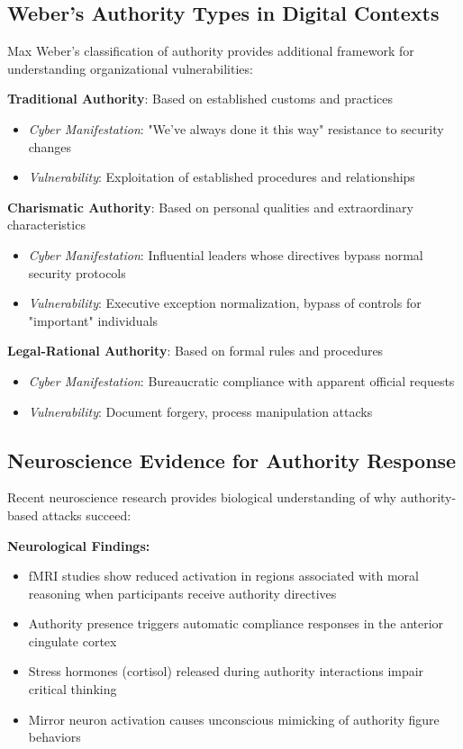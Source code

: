 \documentclass[11pt,a4paper]{article}
\begin{document}
\subsection{Weber's Authority Types in Digital Contexts}

Max Weber's classification of authority provides additional framework for understanding organizational vulnerabilities:

\textbf{Traditional Authority}: Based on established customs and practices
\begin{itemize}
\item \textit{Cyber Manifestation}: "We've always done it this way" resistance to security changes
\item \textit{Vulnerability}: Exploitation of established procedures and relationships
\end{itemize}

\textbf{Charismatic Authority}: Based on personal qualities and extraordinary characteristics
\begin{itemize}
\item \textit{Cyber Manifestation}: Influential leaders whose directives bypass normal security protocols
\item \textit{Vulnerability}: Executive exception normalization, bypass of controls for "important" individuals
\end{itemize}

\textbf{Legal-Rational Authority}: Based on formal rules and procedures
\begin{itemize}
\item \textit{Cyber Manifestation}: Bureaucratic compliance with apparent official requests
\item \textit{Vulnerability}: Document forgery, process manipulation attacks
\end{itemize}

\subsection{Neuroscience Evidence for Authority Response}

Recent neuroscience research provides biological understanding of why authority-based attacks succeed:

\textbf{Neurological Findings:}
\begin{itemize}
\item fMRI studies show reduced activation in regions associated with moral reasoning when participants receive authority directives \cite{blass2012}
\item Authority presence triggers automatic compliance responses in the anterior cingulate cortex
\item Stress hormones (cortisol) released during authority interactions impair critical thinking
\item Mirror neuron activation causes unconscious mimicking of authority figure behaviors
\end{itemize}
\end{document}
